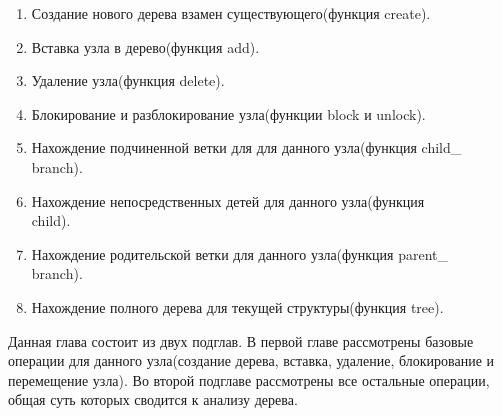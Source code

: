 \documentclass[a4paper,14pt]{extreport}
\theoremstyle{definition}
\begin{document}
\begin{enumerate}
\item Создание нового дерева взамен существующего(функция create).
\item Вставка узла в дерево(функция add).
\item Удаление узла(функция delete).
\item Блокирование и разблокирование узла(функции block и unlock).
\item Нахождение подчиненной ветки для для данного узла(функция child\_ \\branch).
\item Нахождение непосредственных детей для данного узла(функция\\ child).
\item Нахождение родительской ветки для данного узла(функция parent\_ \\branch).
\item Нахождение полного дерева для текущей структуры(функция tree).
\end{enumerate}
Данная глава состоит из двух подглав. В первой главе рассмотрены базовые операции для данного узла(создание дерева, вставка, удаление, блокирование и перемещение узла). Во второй подглаве рассмотрены все остальные операции, общая суть которых сводится к анализу дерева.
\end{document}
